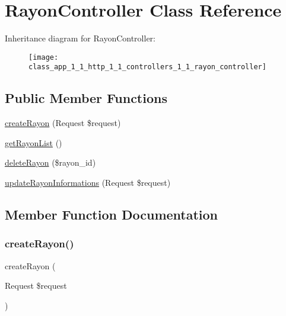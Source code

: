 \hypertarget{class_app_1_1_http_1_1_controllers_1_1_rayon_controller}{}\section{Rayon\+Controller Class Reference}
\label{class_app_1_1_http_1_1_controllers_1_1_rayon_controller}
Inheritance diagram for Rayon\+Controller\+:\begin{figure}[H]
\begin{center}
\leavevmode
\texttt{[image: class\_app\_1\_1\_http\_1\_1\_controllers\_1\_1\_rayon\_controller]}
\end{center}
\end{figure}
\subsection*{Public Member Functions}
\begin{DoxyCompactItemize}
\item 
\mbox{\hyperlink{class_app_1_1_http_1_1_controllers_1_1_rayon_controller_ae6af321443cdc761be445214f46dcc1c}{create\+Rayon}} (Request \$request)
\item 
\mbox{\hyperlink{class_app_1_1_http_1_1_controllers_1_1_rayon_controller_a8b8728239993f1cd9baf9b885e4c16f6}{get\+Rayon\+List}} ()
\item 
\mbox{\hyperlink{class_app_1_1_http_1_1_controllers_1_1_rayon_controller_aed950bc33d12805e528b63217a8048ff}{delete\+Rayon}} (\$rayon\+\_\+id)
\item 
\mbox{\hyperlink{class_app_1_1_http_1_1_controllers_1_1_rayon_controller_a2f62ff6e10dcee45b50db2e170b4ae5d}{update\+Rayon\+Informations}} (Request \$request)
\end{DoxyCompactItemize}


\subsection{Member Function Documentation}
\mbox{\label{class_app_1_1_http_1_1_controllers_1_1_rayon_controller_ae6af321443cdc761be445214f46dcc1c}} 
\subsubsection{\texorpdfstring{create\+Rayon()}{createRayon()}}
{\footnotesize\ttfamily create\+Rayon (\begin{DoxyParamCaption}\item[{Request}]{\$request }\end{DoxyParamCaption})}

